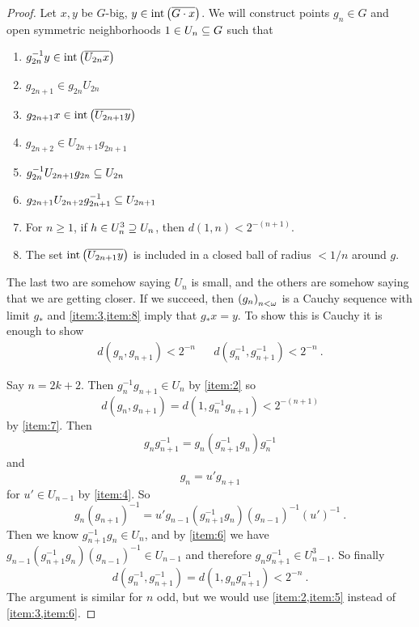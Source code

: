 \documentclass{amsart}
\begin{document}
\begin{proof}
Let $x,y$ be $G$-big, $y\in \operatorname{int}\left(\overline{G\cdot x}\right)$.
We will construct points $g_n \in G$ and open symmetric neighborhoods $1\in U_n\subseteq G$ such that
\begin{enumerate}
\item $g_{2n}^{-1} y\in \operatorname{int}\left(\overline{U_{2n} x}\right)$
\label{item:1}
\item $g_{2n+1} \in g_{2n} U_{2n}$
\label{item:2}
\item $g_{2n+1} x \in \operatorname{int}\left(\overline{U_{2n+1} y}\right)$
\label{item:3}
\item $g_{2n+2} \in  U_{2n+1} g_{2n+1}$
\label{item:4}
\item $g_{2n}^{-1} U_{2n+1} g_{2n} \subseteq U_{2n}$
\label{item:5}
\item $g_{2n+1} U_{2n+2} g_{2n+1}^{-1} \subseteq U_{2n+1}$
\label{item:6}
\item For $n\geq 1$, if $h\in U_n^3 \supseteq U_n$, then $d\left(1,n\right) <
2^{-\left(n+1\right)}$.\label{item:7}
\item The set $\operatorname{int}\left(\overline{U_{2n+1} y}\right)$ is included in a closed ball of radius
$<1/n$ around $g$. 
\label{item:8}
\end{enumerate}
The last two are somehow saying $U_n$ is small, and the others are somehow saying that we
are getting closer. If we succeed, then $\left(g_n\right)_{n < \omega}$ is a Cauchy sequence
with limit $g_*$ and \cref{item:3,item:8} imply that $g_* x = y$.
To show this is Cauchy it is enough to show 
\begin{align}
d\left(g_n , g_{n+1}\right) < 2^{-n}
&&
d\left(g_n^{-1} , g_{n+1}^{-1}\right) < 2^{-n} \ .
\end{align}

Say $n = 2k+2$. Then $g_n^{-1} g_{n+1}\in U_n$ by \cref{item:2} so
\begin{equation}
d\left(g_n , g_{n+1}\right) = d\left(1 , g_n^{-1} g_{n+1}\right) < 2^{-\left(n+1\right)}
\end{equation}
by \cref{item:7}.
Then
\begin{equation}
g_n g_{n+1}^{-1} = g_n\left(g_{n+1}^{-1} g_n\right) g_n^{-1}
\end{equation}
and
\begin{equation}
g_n = u' g_{n+1}
\end{equation}
for $u'\in U_{n-1}$ by \cref{item:4}.
So
\begin{equation}
g_n\left(g_{n+1}\right)^{-1} = u' g_{n-1}\left(g_{n+1}^{-1} g_n\right)
\left(g_{n-1}\right)^{-1} \left(u'\right)^{-1} \ .
\end{equation}
Then we know $g_{n+1}^{-1} g_n \in U_n$, and by \cref{item:6} we have
$g_{n-1}\left(g_{n+1}^{-1} g_n\right)\left(g_{n-1}\right)^{-1} \in U_{n-1}$
and therefore $g_ng_{n+1}^{-1}\in U_{n-1}^3$.
So finally
\begin{equation}
d\left(g_n^{-1} , g_{n+1}^{-1}\right) = d\left(1 , g_n g_{n+1}^{-1}\right) < 2^{-n} \ .
\end{equation}
The argument is similar for $n$ odd, but we would use \cref{item:2,item:5} instead of
\cref{item:3,item:6}.


\end{proof}
\end{document}
